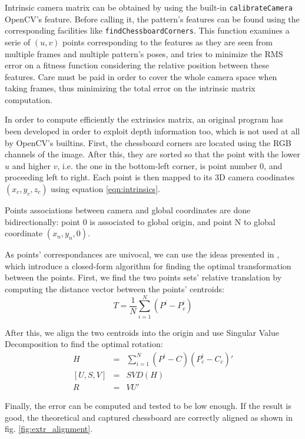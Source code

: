 Intrinsic camera matrix can be obtained by using the built-in
\texttt{calibrateCamera} OpenCV's feature.
Before calling it, the pattern's features can be found using the corresponding
facilities like \texttt{findChessboardCorners}. This function examines a serie
of $(u,v)$ points corresponding to the features as they are seen from multiple
frames and multiple pattern's poses, and tries to minimize the RMS error on a
fitness function considering the relative position between these features. Care
must be paid in order to cover the whole camera space when taking frames, thus
minimizing the total error on the intrinsic matrix computation.

In order to compute efficiently the extrinsics matrix, an original program has
been developed in order to exploit depth information too, which is not used at
all by OpenCV's builtins. First, the chessboard corners are located using the RGB
channels of the image. After this, they are sorted so that the point with the
lower $u$ and higher $v$, i.e. the one in the bottom-left corner, is point
number 0, and proceeding left to right. Each point is then mapped to its 3D
camera coodinates $(x_c,y_c,z_c)$ using equation \ref{eqn:intrinsics}. 

Points associations between camera and global coordinates are done
bidirectionally: point 0 is associated to global origin, and point N to global
coordinate $(x_n, y_n, 0)$.

As points' correspondances are univocal, we can use the ideas presented in
\cite{extrinsics-algorithm}, which introduce a closed-form algorithm for finding
the optimal transformation between the points. First, we find the two points sets' relative
translation by computing the distance vector between the points' centroids:
\begin{equation}
  T=\frac{1}{N}\sum_{i=1}^{N}(P^i-P_c^i)
\end{equation}

After this, we align the two centroids into the origin and use Singular Value
Decomposition to find the optimal rotation:
\begin{eqnarray}
  H &=& \sum_{i=1}^{N} (P^i - C)(P_c^i - C_c)' \\
  \left[U,S,V\right] &=& SVD(H) \\
  R &=& VU'
\end{eqnarray}

Finally, the error can be computed and tested to be low enough. If the result is
good, the theoretical and captured chessboard are correctly aligned as shown in
fig. \ref{fig:extr_alignment}.

